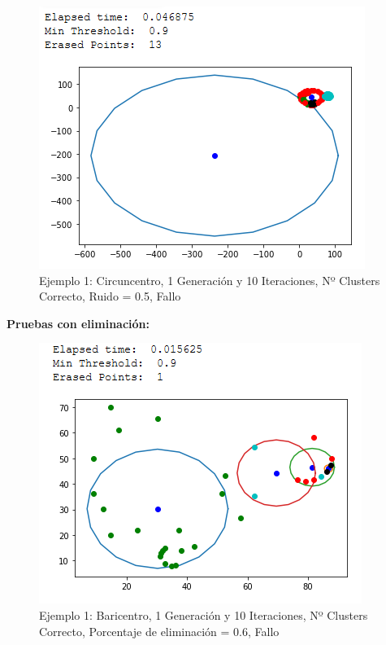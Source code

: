 \documentclass[conference,a4paper]{IEEEtran}
\begin{document}
\begin{figure}[H]
\centering
\includegraphics[scale=0.65]{Experimentacion/Ejemplo1/ej1_c_1_10_lr_wrong}
\caption{Ejemplo 1: Circuncentro, 1 Generación y 10 Iteraciones,  Nº Clusters Correcto, Ruido = 0.5, Fallo\\}
\end{figure}

\clearpage
\textbf{Pruebas con eliminación:}\\

\begin{figure}[H]
\centering
\includegraphics[scale=0.65]{Experimentacion/Ejemplo1/ej1_b_1_10_me}
\caption{Ejemplo 1: Baricentro, 1 Generación y 10 Iteraciones,  Nº Clusters Correcto, Porcentaje de eliminación = 0.6, Fallo\\}
\end{figure}
\end{document}
